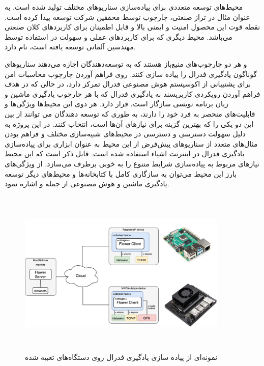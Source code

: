 محیط‌های توسعه متعددی برای پیاده‌سازی سناریوهای مختلف تولید شده‌ است. به عنوان مثال در تراز صنعتی، چارچوب  توسط محققین شرکت  توسعه پیدا کرده است\cite{a1}. نقطه قوت این محصول امنیت و ایمنی بالا و قابل اطمینان برای کاربردهای کلان صنعتی می‌باشد. محیط دیگری که برای کاربردهای عملی و سهولت در استفاده توسط مهندسین آلمانی توسعه یافته است،  نام دارد\cite{b1}. 

 و  هر دو چارچوب‌های منبع‌باز هستند که به توسعه‌دهندگان اجازه می‌دهند سناریوهای گوناگون یادگیری فدرال را پیاده سازی کنند.  روی فراهم آوردن چارچوب محاسبات امن برای پشتیبانی از اکوسیستم هوش مصنوعی فدرال تمرکز دارد، در حالی که  در هدف فراهم آوردن رویکردی کاربرپسند به یادگیری فدرال که با هر چارچوب یادگیری ماشین و زبان برنامه نویسی سازگار است، قرار دارد. هر دوی این محیط‌ها ویژگی‌ها و قابلیت‌های منحصر به فرد خود را دارند، به طوری که توسعه دهندگان می توانند از بین این دو یکی را که بهترین گزینه برای نیاز‌های آن‌ها است، انتخاب کنند. در این پروژه به دلیل سهولت دسترسی و دسترسی در محیط‌های شبیه‌سازی مختلف و فراهم بودن مثال‌های متعدد از سناریو‌های پیش‌فرض از این محیط به عنوان ابزاری برای پیاده‌سازی یادگیری فدرال در اینترنت اشیاء استفاده شده است. قابل ذکر است که این محیط نیازهای مربوط به پیاده‌سازی شرایط متنوع را به خوبی برطرف می‌سازد. از ویژگی‌های بارز این محیط می‌توان به سازگاری کامل با کتابخانه‌ها و محیط‌های دیگر توسعه یادگیری ماشین و هوش مصنوعی از جمله  و  اشاره نمود.

\begin{figure}[H]
    \centering
   \includegraphics[height=8cm,width=10cm]{./Embedded/demo_diagram.png}
   \caption{ نمونه‌ای از پیاده سازی یادگیری فدرال روی دستگاه‌های تعبیه شده}
   \label{ pii }
   \centering
\end{figure}

